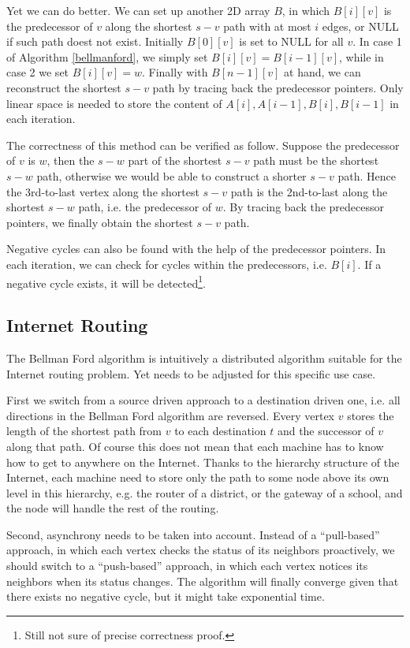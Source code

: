 Yet we can do better. We can set up another 2D array $B$, in which $B[i][v]$ is the predecessor of $v$ along the shortest $s-v$ path with at most $i$ edges, or NULL if such path doest not exist. Initially $B[0][v]$ is set to NULL for all $v$. In case 1 of Algorithm \ref{bellmanford}, we simply set $B[i][v]=B[i-1][v]$, while in case 2 we set $B[i][v]=w$. Finally with $B[n-1][v]$ at hand, we can reconstruct the shortest $s-v$ path by tracing back the predecessor pointers. Only linear space is needed to store the content of $A[i],A[i-1],B[i],B[i-1]$ in each iteration.

The correctness of this method can be verified as follow. Suppose the predecessor of $v$ is $w$, then the $s-w$ part of the shortest $s-v$ path must be the shortest $s-w$ path, otherwise we would be able to construct a shorter $s-v$ path. Hence the 3rd-to-last vertex along the shortest $s-v$ path is the 2nd-to-last along the shortest $s-w$ path, i.e. the predecessor of $w$. By tracing back the predecessor pointers, we finally obtain the shortest $s-v$ path.

Negative cycles can also be found with the help of the predecessor pointers. In each iteration, we can check for cycles within the predecessors, i.e. $B[i]$. If a negative cycle exists, it will be detected\footnote{Still not sure of precise correctness proof.}. 
\subsection{Internet Routing}
The Bellman Ford algorithm is intuitively a distributed algorithm suitable for the Internet routing problem. Yet needs to be adjusted for this specific use case. 

First we switch from a source driven approach to a destination driven one, i.e. all directions in the Bellman Ford algorithm are reversed. Every vertex $v$ stores the length of the shortest path from $v$ to each destination $t$ and the successor of $v$ along that path. Of course this does not mean that each machine has to know how to get to anywhere on the Internet. Thanks to the hierarchy structure of the Internet, each machine need to store only the path to some node above its own level in this hierarchy, e.g. the router of a district, or the gateway of a school, and the node will handle the rest of the routing. 

Second, asynchrony needs to be taken into account. Instead of a ``pull-based'' approach, in which each vertex checks the status of its neighbors proactively, we should switch to a ``push-based'' approach, in which each vertex notices its neighbors when its status changes. The algorithm will finally converge given that there exists no negative cycle, but it might take exponential time.

